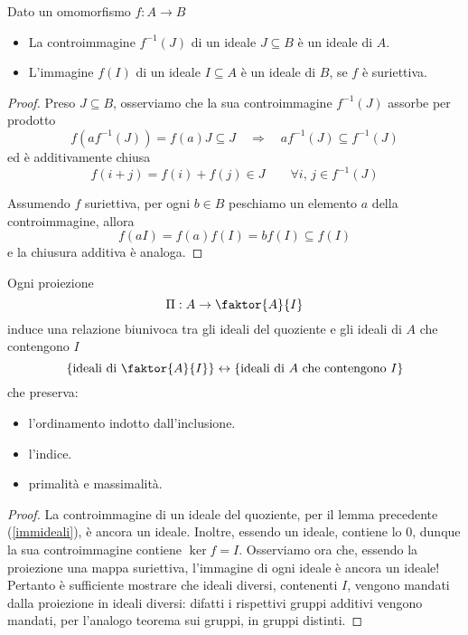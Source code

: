 \begin{multicols}{2}
\begin{prop}\label{immideali}
	Dato un omomorfismo $ f : A \to B $
	\begin{itemize}
		\item La controimmagine $ f^{-1}(J) $ di un ideale $ J \subseteq B $ è un ideale di $ A $.
		\item L'immagine $ f(I) $ di un ideale $ I \subseteq A $ è un ideale di $ B $, se $ f $ è suriettiva.
	\end{itemize}
\end{prop}
\begin{proof}
	Preso $ J \subseteq B $, osserviamo che la sua controimmagine $ f^{-1}(J) $ assorbe per prodotto
	\[ f(af^{-1}(J)) = f(a)J \subseteq J \quad\Rightarrow\quad af^{-1}(J) \subseteq f^{-1}(J)  \]
	ed è additivamente chiusa
	\[ f(i + j) = f(i) + f(j) \in J \qquad \forall i, \, j \in f^{-1}(J) \]
	
	Assumendo $ f $ suriettiva, per ogni $ b \in B $ peschiamo un elemento $ a $ della controimmagine, allora
	\[ f(aI) = f(a)f(I) = bf(I) \subseteq f(I) \]
	e la chiusura additiva è analoga.
\end{proof}

\begin{theorem}[di corrispondenza]\label{corr}
	Ogni proiezione $$  \Pi : A \to \faktor{A}{I}  $$ induce una relazione biunivoca tra gli ideali del quoziente e gli ideali di $ A $ che contengono $ I $
	\[ \{ \text{ideali di }\faktor{A}{I} \} \leftrightarrow \{ \text{ideali di $ A $ che contengono $ I $} \} \]
	che preserva:
	\begin{itemize}
		\item l'ordinamento indotto dall'inclusione.
		\item l'indice.
		\item primalità e massimalità.
	\end{itemize}
\end{theorem}
\begin{proof}
	La controimmagine di un ideale del quoziente, per il lemma precedente (\ref{immideali}), è ancora un ideale.
	Inoltre, essendo un ideale, contiene lo $ 0 $, dunque la sua controimmagine contiene $ \ker f = I $. Osserviamo ora che, essendo la proiezione una mappa suriettiva, l'immagine di ogni ideale è ancora un ideale! Pertanto è sufficiente mostrare che ideali diversi, contenenti $ I $, vengono mandati dalla proiezione in ideali diversi: difatti i rispettivi gruppi additivi vengono mandati, per l'analogo teorema sui gruppi, in gruppi distinti.
\end{proof}


\end{multicols}
